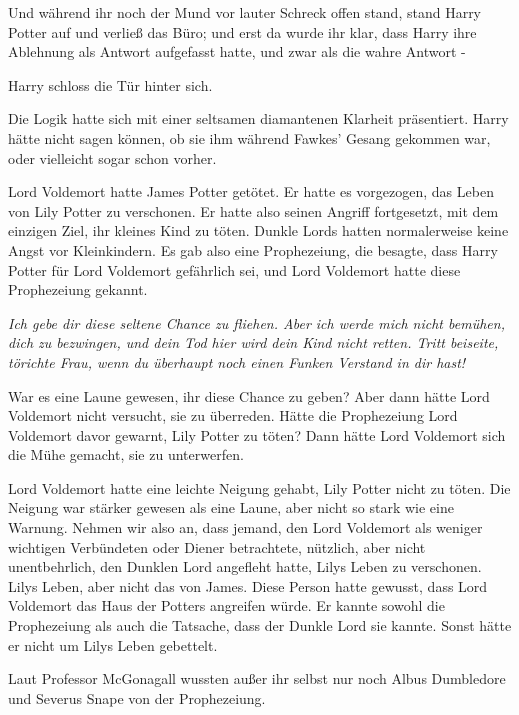 Und während ihr noch der Mund vor lauter Schreck offen stand, stand Harry Potter
auf und verließ das Büro; und erst da wurde ihr klar, dass Harry ihre Ablehnung
als Antwort aufgefasst hatte, und zwar als die wahre Antwort -

Harry schloss die Tür hinter sich.

Die Logik hatte sich mit einer seltsamen diamantenen Klarheit präsentiert. Harry
hätte nicht sagen können, ob sie ihm während Fawkes' Gesang gekommen war, oder
vielleicht sogar schon vorher.

Lord Voldemort hatte James Potter getötet. Er hatte es vorgezogen, das Leben von
Lily Potter zu verschonen. Er hatte also seinen Angriff fortgesetzt, mit dem
einzigen Ziel, ihr kleines Kind zu töten. Dunkle Lords hatten normalerweise
keine Angst vor Kleinkindern. Es gab also eine Prophezeiung, die besagte, dass
Harry Potter für Lord Voldemort gefährlich sei, und Lord Voldemort hatte diese
Prophezeiung gekannt.

\glqq{}\emph{Ich gebe dir diese seltene Chance zu fliehen. Aber ich werde mich
nicht bemühen, dich zu bezwingen, und dein Tod hier wird dein Kind nicht retten.
Tritt beiseite, törichte Frau, wenn du überhaupt noch einen Funken Verstand in
dir hast!}\grqq{}

War es eine Laune gewesen, ihr diese Chance zu geben? Aber dann hätte Lord
Voldemort nicht versucht, sie zu überreden. Hätte die Prophezeiung Lord
Voldemort davor gewarnt, Lily Potter zu töten? Dann hätte Lord Voldemort sich
die Mühe gemacht, sie zu unterwerfen.

Lord Voldemort hatte eine leichte Neigung gehabt, Lily Potter nicht zu töten.
Die Neigung war stärker gewesen als eine Laune, aber nicht so stark wie eine
Warnung. Nehmen wir also an, dass jemand, den Lord Voldemort als weniger
wichtigen Verbündeten oder Diener betrachtete, nützlich, aber nicht
unentbehrlich, den Dunklen Lord angefleht hatte, Lilys Leben zu verschonen.
Lilys Leben, aber nicht das von James. Diese Person hatte gewusst, dass Lord
Voldemort das Haus der Potters angreifen würde. Er kannte sowohl die
Prophezeiung als auch die Tatsache, dass der Dunkle Lord sie kannte. Sonst hätte
er nicht um Lilys Leben gebettelt.

Laut Professor McGonagall wussten außer ihr selbst nur noch Albus Dumbledore und
Severus Snape von der Prophezeiung.


